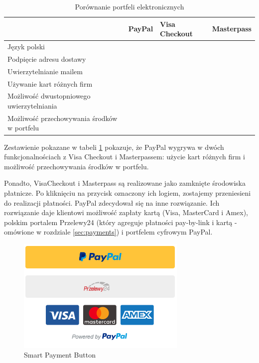 \documentclass[12pt]{article}
\newcommand{\cmark}{\textcolor{green!80!black}{\ding{51}}}
\newcommand{\xmark}{\textcolor{red}{\ding{55}}}
\numberwithin{figure}{section}
\begin{document}
\begin{table}[H]
\begin{tabular}{|p{5cm}|c|c|c|}
\hline
 & \multicolumn{1}{l|}{\textbf{PayPal}} & \multicolumn{1}{l|}{\textbf{Visa Checkout}} & \multicolumn{1}{l|}{\textbf{Masterpass}} \\ \hline
Język polski & \cmark & \cmark & \cmark \\ \hline
Podpięcie adresu dostawy & \cmark & \cmark & \cmark \\ \hline
Uwierzytelnianie mailem & \cmark & \cmark & \xmark \\ \hline
Używanie kart różnych firm & \cmark & \xmark & \xmark \\ \hline
Możliwość dwustopniowego uwierzytelniania & \cmark & \xmark & \cmark \\ \hline
Możliwość przechowywania środków w portfelu & \cmark & \xmark & \xmark \\ \hline
\end{tabular}
\caption{Porównanie portfeli elektronicznych}
\label{tab:portfele}
\end{table}

Zestawienie pokazane w tabeli \ref{tab:portfele} pokazuje, że PayPal wygrywa w dwóch funkcjonalnościach z Visa Checkout i Masterpassem: użycie kart różnych firm i możliwość przechowywania środków w portfelu.

Ponadto, VisaCheckout i Masterpass są realizowane jako zamknięte środowiska płatnicze. Po kliknięciu na przycisk oznaczony ich logiem, zostajemy przeniesieni do realizacji płatności. PayPal zdecydował się na inne rozwiązanie. Ich rozwiązanie daje klientowi możliwość zapłaty kartą (Visa, MasterCard i Amex), polskim portalem Przelewy24 (który agreguje płatności pay-by-link i kartą - omówione w rozdziale \ref{sec:payments}) i portfelem cyfrowym PayPal. 

\begin{figure}[H] 
 	\centering
	\includegraphics[scale=1.0]{images/chapter_2/paypal-button.png}
	\caption{Smart Payment Button}
	\label{fig:paypal-button}
\end{figure}
\end{document}
